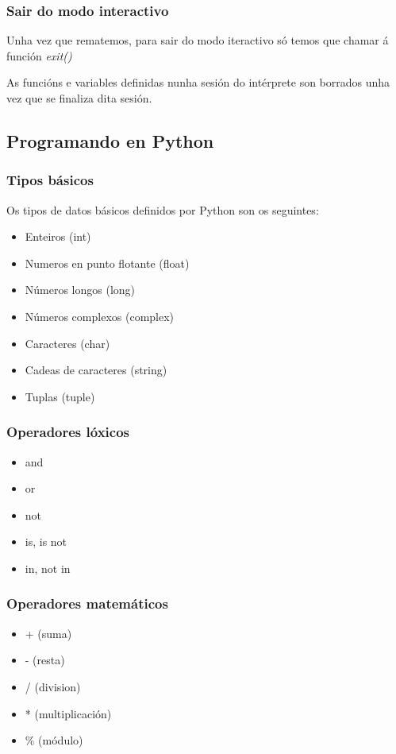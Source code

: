 \begin{frame}
  \frametitle{Sair do modo interactivo}
  Unha vez que rematemos, para sair do modo iteractivo só temos que chamar á
  función \emph{exit()}

  As funcións e variables definidas nunha sesión do intérprete son borrados unha
  vez que se finaliza dita sesión.
\end{frame}

\subsection{Programando en Python}
\label{subsec:Programando}

\begin{frame}
  \frametitle{Tipos básicos}
  Os tipos de datos básicos definidos por Python son os seguintes:
  \begin{itemize}
  \item Enteiros (int)
  \item Numeros en punto flotante (float)
  \item Números longos (long)
  \item Números complexos (complex)
  \item Caracteres (char)
  \item Cadeas de caracteres (string)
  \item Tuplas (tuple)
  \end{itemize}
\end{frame}

\begin{frame}
  \frametitle{Operadores lóxicos}
  \begin{itemize}
  \item and
  \item or
  \item not
  \item is, is not
  \item in, not in
  \end{itemize}
\end{frame}

\begin{frame}
  \frametitle{Operadores matemáticos}
  \begin{itemize}
  \item + (suma)
  \item - (resta)
  \item / (division)
  \item * (multiplicación)
  \item \% (módulo)
  \end{itemize}
\end{frame}

